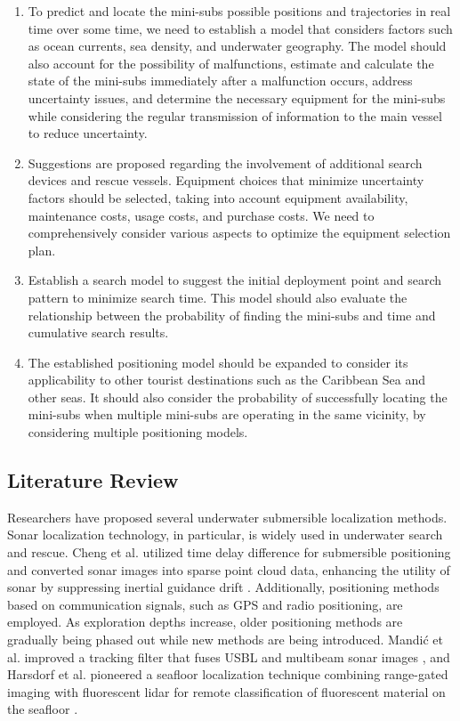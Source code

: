 \documentclass[12pt]{article}
\begin{document}
\begin{enumerate}
    \item To predict and locate the mini-subs possible positions and trajectories in real time over some time, we need to establish a model that considers factors such as ocean currents, sea density, and underwater geography. The model should also account for the possibility of malfunctions, estimate and calculate the state of the mini-subs immediately after a malfunction occurs, address uncertainty issues, and determine the necessary equipment for the mini-subs while considering the regular transmission of information to the main vessel to reduce uncertainty. \label{problem1}
    \item  Suggestions are proposed regarding the involvement of additional search devices and rescue vessels. Equipment choices that minimize uncertainty factors should be selected, taking into account equipment availability, maintenance costs, usage costs, and purchase costs. We need to comprehensively consider various aspects to optimize the equipment selection plan.  \label{problem2}
    \item Establish a search model to suggest the initial deployment point and search pattern to minimize search time. This model should also evaluate the relationship between the probability of finding the mini-subs and time and cumulative search results.  \label{problem3}
    \item The established positioning model should be expanded to consider its applicability to other tourist destinations such as the Caribbean Sea and other seas. It should also consider the probability of successfully locating the mini-subs when multiple mini-subs are operating in the same vicinity, by considering multiple positioning models. \label{problem4}
\end{enumerate}

\subsection{Literature Review}

Researchers have proposed several underwater submersible localization methods. Sonar localization technology, in particular, is widely used in underwater search and rescue. Cheng et al. utilized time delay difference for submersible positioning and converted sonar images into sparse point cloud data, enhancing the utility of sonar by suppressing inertial guidance drift \cite{PMID:35095458}. Additionally, positioning methods based on communication signals, such as GPS and radio positioning, are employed. \cite{10.1016/s0034-4257(00)00092-4} As exploration depths increase, older positioning methods are gradually being phased out while new methods are being introduced. Mandić et al. improved a tracking filter that fuses USBL and multibeam sonar images \cite{Underwater}, and Harsdorf et al. pioneered a seafloor localization technique combining range-gated imaging with fluorescent lidar for remote classification of fluorescent material on the seafloor \cite{Submarine}.
\end{document}

